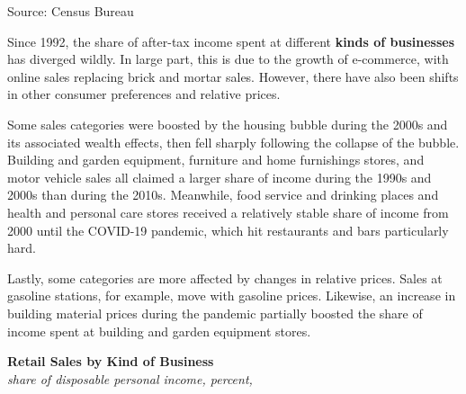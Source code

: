 \documentclass{report}
\makeatletter
\newcommand{\tbllink}[1]{\href{https://raw.githubusercontent.com/bdecon/US-chartbook/master/chartbook/data/#1}{\faTable}}
\newcommand*\short[1]{\expandafter\@gobbletwo\number\numexpr#1\relax}
\newcommand{\absnode}[3]{\node[below right, align=left] at (axis cs: #1,#2) {#3};}
\newcommand{\dateaxisticks}{
		date coordinates in=x, axis line style={draw=none},
		xmax={2024-01-31},
		max space between ticks=40,	    
		xtick={{1990-01-01}, {1992-01-01}, {1994-01-01}, 
			{1996-01-01}, {1998-01-01}, {2000-01-01}, 
			{2002-01-01}, {2004-01-01}, {2006-01-01},
			{2008-01-01}, {2010-01-01}, {2012-01-01}, {2014-01-01},
		    {2016-01-01}, {2018-01-01}, {2020-01-01}, {2022-01-01}, 
		    {2024-01-01}, {2026-01-01}},
		minor xtick={{1989-01-01}, {1991-01-01}, {1993-01-01},
			{1995-01-01}, {1997-01-01}, {1999-01-01}, 
			{2001-01-01}, {2003-01-01}, {2005-01-01}, {2007-01-01},
		    {2009-01-01}, {2011-01-01}, {2013-01-01}, {2015-01-01},
		    {2017-01-01}, {2019-01-01}, {2021-01-01}, {2023-01-01}, 
		    {2025-01-01}, {2027-01-01}},
		enlarge y limits={0.06}, enlarge x limits={0.01},
		xticklabel style={align=center, yshift=-2pt}, tick label style={inner sep=0pt},
		}
\newcommand{\bbar}[2]{extra #1 ticks = {{#2}}, extra #1 tick labels = ,
		extra #1 tick style = {grid=major, grid style={thick, black!25}},}
\newcommand{\stdline}[4]{\addplot[very thick, no markers, color=#1] 
		table [x=#2, y=#3, col sep=comma] {#4};	}
\newcommand{\thickline}[4]{\addplot[ultra thick, no markers, color=#1] 
		table [x=#2, y=#3, col sep=comma] {#4};	}
\newcommand{\rebars}{
		\fill[color=black!10] (axis cs:{2007-12-01},\pgfkeysvalueof{/pgfplots/ymin}) 
			rectangle (axis cs:{2009-07-01}, \pgfkeysvalueof{/pgfplots/ymax});
		\fill[color=black!10] (axis cs:{2001-03-01},\pgfkeysvalueof{/pgfplots/ymin}) 
			rectangle (axis cs:{2001-11-01}, \pgfkeysvalueof{/pgfplots/ymax});
		\fill[color=black!10] (axis cs:{2020-02-01},\pgfkeysvalueof{/pgfplots/ymin}) 
			rectangle (axis cs:{2020-05-01}, \pgfkeysvalueof{/pgfplots/ymax});}
\makeatother
\begin{document}
{\begin{minipage}{1.0\textwidth}
\hspace{3mm} 

\footnotesize{Source: Census Bureau} \hfill \tbllink{marts.csv}
\end{minipage}
\newpage
\begin{minipage}{1.0\textwidth}  
\small Since 1992, the share of after-tax income spent at different \textbf{kinds of businesses} has diverged wildly. In large part, this is due to the growth of e-commerce, with online sales replacing brick and mortar sales. However, there have also been shifts in other consumer preferences and relative prices. 

 

Some sales categories were boosted by the housing bubble during the 2000s and its associated wealth effects, then fell sharply following the collapse of the bubble. Building and garden equipment, furniture and home furnishings stores, and motor vehicle sales all claimed a larger share of income during the 1990s and 2000s than during the 2010s. Meanwhile, food service and drinking places and health and personal care stores received a relatively stable share of income from 2000 until the COVID-19 pandemic, which hit restaurants and bars particularly hard. 

Lastly, some categories are more affected by changes in relative prices. Sales at gasoline stations, for example, move with gasoline prices. Likewise, an increase in building material prices during the pandemic partially boosted the share of income spent at building and garden equipment stores. 
\end{minipage}
\vspace{2mm}

\begin{minipage}{0.82\textwidth}
\normalsize \textbf{Retail Sales by Kind of Business}\\
\footnotesize{\textit{share of disposable personal income, percent, }}
\vspace{-1mm}


\end{minipage}}
\end{document}
